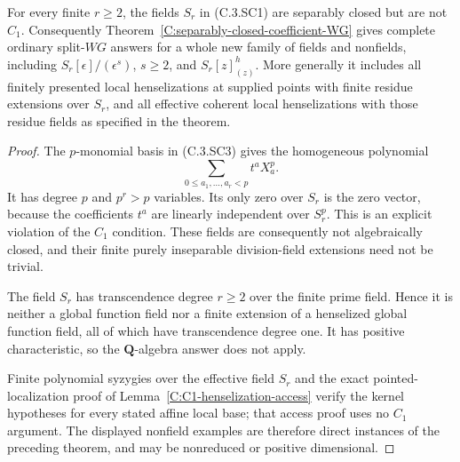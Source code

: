 \begin{corollary}
\label{C:separably-closed-nonC1-family}
For every finite $r\ge2$, the fields
$S_r$ in (C.3.SC1) are separably closed
but are not $C_1$.
Consequently
Theorem~\ref{C:separably-closed-coefficient-WG}
gives complete ordinary split-$WG$
answers for a whole new family of
fields and nonfields, including
$S_r[\epsilon]/(\epsilon^s)$,
$s\ge2$, and $S_r[z]_{(z)}^h$.
More generally it includes all
finitely presented local henselizations
at supplied points with finite
residue extensions over $S_r$,
and all effective coherent local
henselizations with those residue
fields as specified in the theorem.
\end{corollary}
\begin{proof}
The $p$-monomial basis in
(C.3.SC3) gives the homogeneous
polynomial
\[
        \sum_{0\le a_1,\ldots,a_r<p}
                    t^a X_a^p .                       \tag{C.3.SC6}
\]
It has degree $p$ and $p^r>p$
variables.  Its only zero over
$S_r$ is the zero vector,
because the coefficients $t^a$
are linearly independent over
$S_r^p$.
This is an explicit violation
of the $C_1$ condition.
These fields are consequently
not algebraically closed, and
their finite purely inseparable
division-field extensions need
not be trivial.

The field $S_r$ has transcendence
degree $r\ge2$ over the finite
prime field.  Hence it is
neither a global function
field nor a finite extension
of a henselized global
function field, all of which
have transcendence degree one.
It has positive characteristic,
so the $\mathbf Q$-algebra
answer does not apply.

Finite polynomial syzygies over
the effective field $S_r$
and the exact pointed-localization
proof of
Lemma~\ref{C:C1-henselization-access}
verify the kernel hypotheses
for every stated affine local
base; that access proof uses
no $C_1$ argument.
The displayed nonfield examples
are therefore direct instances
of the preceding theorem,
and may be nonreduced or
positive dimensional.
\end{proof}
